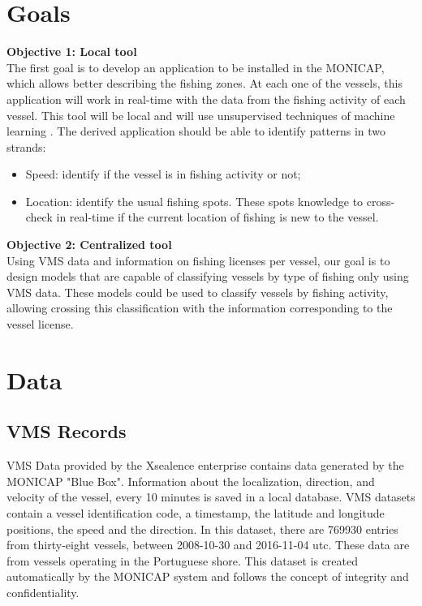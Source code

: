 


\section{Goals} %
\label{sec:objectives}

\textbf{Objective 1: Local tool} \\
The first goal is to develop an application to be installed in the MONICAP, which allows better describing the fishing zones. At each one of the vessels, this application will work in real-time with the data from the fishing activity of each vessel. This tool will be local and will use unsupervised techniques of machine learning \cite{SadoddinML}.
The derived application should be able to identify patterns in two strands:
\begin{itemize}


\item Speed: identify if the vessel is in fishing activity or not;
\item Location: identify the usual fishing spots. These spots knowledge to cross-check in real-time if the current location of fishing is new to the vessel.
\end{itemize}

\textbf{Objective 2: Centralized tool} \\
Using VMS data and information on fishing licenses per vessel, our goal is to design models that are capable of classifying vessels by type of fishing only using VMS data. These models could be used to classify vessels by fishing activity, allowing crossing this classification with the information corresponding to the vessel license.



\section{Data} %
\label{sec:data_int}


\subsection{VMS Records} %
\label{sec:vms_records}

VMS Data provided by the Xsealence \cite{WEBSITE:Xsealence} enterprise contains data generated by the MONICAP \cite{WEBSITE:MonicapXsealence} "Blue Box". Information about the localization, direction, and velocity of the vessel, every 10 minutes is saved in a local database. VMS datasets contain a vessel identification code, a timestamp, the latitude and longitude positions, the speed and the direction. In this dataset, there are 769930 entries from thirty-eight vessels, between 2008-10-30 and 2016-11-04 \gls{utc}. These data are from vessels operating in the Portuguese shore. 
This dataset is created automatically by the MONICAP system and follows the concept of integrity and confidentiality.\\





